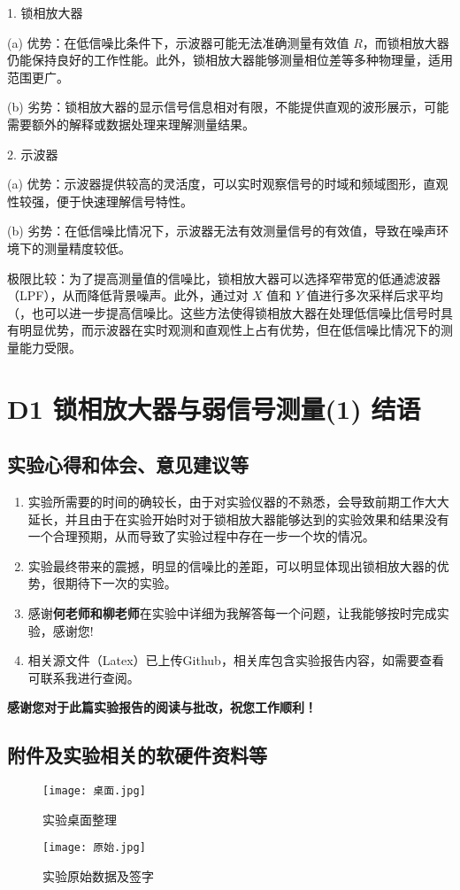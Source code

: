 \documentclass[dvipsnames, svgnames,a4paper,11pt]{article}
\begin{document}
		1. 锁相放大器

		   (a) 优势：在低信噪比条件下，示波器可能无法准确测量有效值 \( R \)，而锁相放大器仍能保持良好的工作性能。此外，锁相放大器能够测量相位差等多种物理量，适用范围更广。

		   (b) 劣势：锁相放大器的显示信号信息相对有限，不能提供直观的波形展示，可能需要额外的解释或数据处理来理解测量结果。
		
		2. 示波器

		   (a) 优势：示波器提供较高的灵活度，可以实时观察信号的时域和频域图形，直观性较强，便于快速理解信号特性。

		   (b) 劣势：在低信噪比情况下，示波器无法有效测量信号的有效值，导致在噪声环境下的测量精度较低。
		
		极限比较：为了提高测量值的信噪比，锁相放大器可以选择窄带宽的低通滤波器（LPF），从而降低背景噪声。此外，通过对 \( X \) 值和 \( Y \) 值进行多次采样后求平均（，也可以进一步提高信噪比。这些方法使得锁相放大器在处理低信噪比信号时具有明显优势，而示波器在实时观测和直观性上占有优势，但在低信噪比情况下的测量能力受限。
	\clearpage
	
	\section{D1 锁相放大器与弱信号测量(1) \quad\heiti 结语}
	
	\subsection{实验心得和体会、意见建议等}
	\begin{enumerate}
		\item 实验所需要的时间的确较长，由于对实验仪器的不熟悉，会导致前期工作大大延长，并且由于在实验开始时对于锁相放大器能够达到的实验效果和结果没有一个合理预期，从而导致了实验过程中存在一步一个坎的情况。
		\item 实验最终带来的震撼，明显的信噪比的差距，可以明显体现出锁相放大器的优势，很期待下一次的实验。
		\item 感谢\textbf{何老师和柳老师}在实验中详细为我解答每一个问题，让我能够按时完成实验，感谢您!
		\item 相关源文件（Latex）已上传Github，相关库包含实验报告内容，如需要查看可联系我进行查阅。
	\end{enumerate}
	\quad \large \textbf{感谢您对于此篇实验报告的阅读与批改，祝您工作顺利！}
	

	\subsection{附件及实验相关的软硬件资料等}
	\begin{figure}[{H}]
		\centering
		\texttt{[image: 桌面.jpg]}
		\caption{实验桌面整理}
		\label{}
	\end{figure}
	

	\begin{figure}[{H}]
		\centering
		\texttt{[image: 原始.jpg]}
		\caption{实验原始数据及签字}
		\label{}
	\end{figure}

	
	
\end{document}
